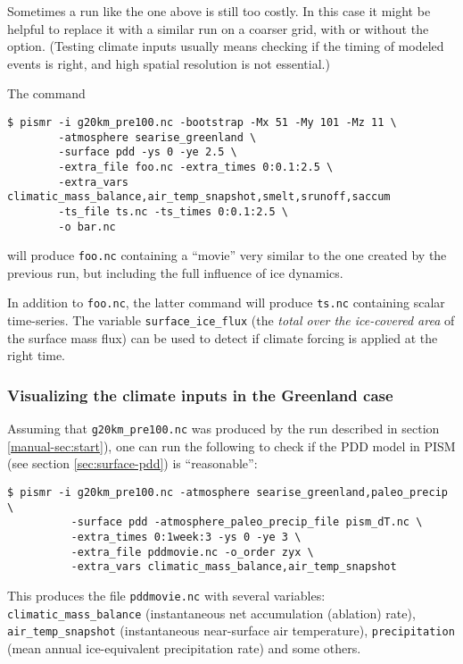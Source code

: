 \documentclass[titlepage,letterpaper,final]{scrartcl}
\begin{document}
Sometimes a run like the one above is still too costly. In this case it might be helpful to replace it with a similar run on a coarser grid, with or without the  option. (Testing climate inputs usually means checking if the timing of modeled events is right, and high spatial resolution is not essential.)

The command
\begin{verbatim}
$ pismr -i g20km_pre100.nc -bootstrap -Mx 51 -My 101 -Mz 11 \
        -atmosphere searise_greenland \
        -surface pdd -ys 0 -ye 2.5 \
        -extra_file foo.nc -extra_times 0:0.1:2.5 \
        -extra_vars climatic_mass_balance,air_temp_snapshot,smelt,srunoff,saccum
        -ts_file ts.nc -ts_times 0:0.1:2.5 \
        -o bar.nc
\end{verbatim}
will produce \texttt{foo.nc} containing a ``movie'' very similar to the one created by the previous run, but including the full influence of ice dynamics.

In addition to \texttt{foo.nc}, the latter command will produce \texttt{ts.nc} containing scalar time-series. The variable \texttt{surface_ice_flux} (the \emph{total over the ice-covered area} of the surface mass flux) can be used to detect if climate forcing is applied at the right time.

\subsubsection{Visualizing the climate inputs in the Greenland case}
\label{sec:pdd-series}

Assuming that \texttt{g20km_pre100.nc} was produced by the run described in section
\ref{manual-sec:start}), one can run the following to check if the PDD
model in PISM (see section \ref{sec:surface-pdd}) is ``reasonable'':
\begin{verbatim}
$ pismr -i g20km_pre100.nc -atmosphere searise_greenland,paleo_precip \
          -surface pdd -atmosphere_paleo_precip_file pism_dT.nc \
          -extra_times 0:1week:3 -ys 0 -ye 3 \
          -extra_file pddmovie.nc -o_order zyx \
          -extra_vars climatic_mass_balance,air_temp_snapshot
\end{verbatim}
This produces the file \texttt{pddmovie.nc} with several variables: \texttt{climatic_mass_balance}
(instantaneous net accumulation (ablation) rate), \texttt{air_temp_snapshot}
(instantaneous near-surface air temperature), \texttt{precipitation} (mean annual
ice-equivalent precipitation rate) and some others.
\end{document}
